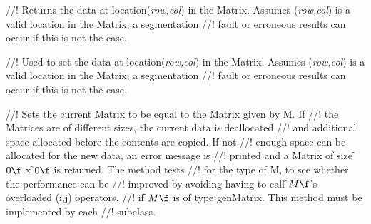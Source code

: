 //! Returns the data at location({\em row,col}) in the Matrix. Assumes
({\em row,col}) is a valid location in the Matrix, a segmentation
//! fault or erroneous results can occur if this is not the case.

//! Used to set the data at location({\em row,col}) in the Matrix. Assumes
({\em row,col}) is a valid location in the Matrix, a segmentation
//! fault or erroneous results can occur if this is not the case.


//! Sets the current Matrix to be equal to the Matrix given by \p M. If
//! the Matrices are of different sizes, the current data is deallocated
//! and additional space allocated before the contents are copied. If not
//! enough space can be allocated for the new data, an error message is
//! printed and a Matrix of size \f$0\f$ x \f$0\f$ is returned. The method tests
//! for the type of \p M, to see whether the performance can be
//! improved by avoiding having to call \f$M\f$'s overloaded (i,j) operators,
//! if \f$M\f$ is of type genMatrix. This method must be implemented by each
//! subclass. 

